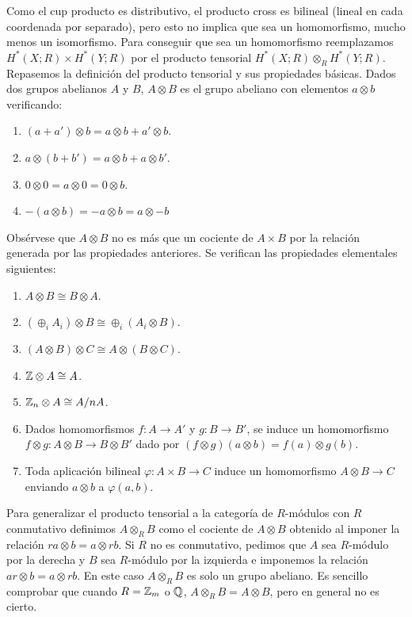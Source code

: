 \documentclass[TA.tex]{subfiles}
\begin{document}
Como el cup producto es distributivo, el producto cross es bilineal (lineal en cada coordenada por separado), pero esto no implica que sea un homomorfismo, mucho menos un isomorfismo. Para conseguir que sea un homomorfismo reemplazamos $H^*(X;R)\times H^*(Y;R)$ por el producto tensorial $H^*(X;R)\otimes_R H^*(Y;R)$. Repasemos la definición del producto tensorial y sus propiedades básicas. Dados dos grupos abelianos $A$ y $B$, $A\otimes B$ es el grupo abeliano con elementos $a\otimes b$ verificando:
\begin{enumerate}
\item $(a+a')\otimes b=a\otimes b+a'\otimes b$.
\item $a\otimes (b+b')=a\otimes b+a\otimes b'$.
\item $0\otimes 0=a\otimes 0=0\otimes b$.
\item $-(a\otimes b)=-a\otimes b=a\otimes -b$
\end{enumerate} 

Obsérvese que $A\otimes B$ no es más que un cociente de $A\times B$ por la relación generada por las propiedades anteriores. Se verifican las propiedades elementales siguientes:
\begin{enumerate}
\item $A\otimes B\cong B\otimes A$.
\item $(\oplus_i A_i)\otimes B\cong \oplus_i(A_i\otimes B)$.
\item $(A\otimes B)\otimes C\cong A\otimes (B\otimes C)$.
\item $\mathbb{Z}\otimes A\cong A$.
\item $\mathbb{Z}_n\otimes A\cong A/nA$. 
\item Dados homomorfismos $f:A\to A'$ y $g:B\to B'$, se induce un homomorfismo $f\otimes g:A\otimes B\to B\otimes B'$ dado por $(f\otimes g)(a\otimes b)=f(a)\otimes g(b)$. 
\item Toda aplicación bilineal $\varphi:A\times B\to C$ induce un homomorfismo $A\otimes B\to C$ enviando $a\otimes b$ a $\varphi(a,b)$. 
\end{enumerate}

Para generalizar el producto tensorial a la categoría de $R$-módulos con $R$ conmutativo definimos $A\otimes_R B$ como el cociente de $A\otimes B$ obtenido al imponer la relación $ra\otimes b=a\otimes rb$. Si $R$ no es conmutativo, pedimos que $A$ sea $R$-módulo por la derecha y $B$ sea $R$-módulo por la izquierda e imponemos la relación $ar\otimes b=a\otimes rb$. En este caso $A\otimes_R B$ es solo un grupo abeliano. Es sencillo comprobar que cuando $R=\mathbb{Z}_m$ o $\mathbb{Q}$, $A\otimes_R B=A\otimes B$, pero en general no es cierto. 
\end{document}
